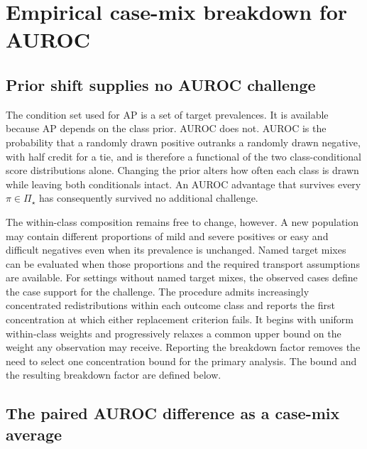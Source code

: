 \documentclass[11pt]{article}
\newcommand{\PSet}{\Pi_\star}
\theoremstyle{remark}
\begin{document}
\section{Empirical case-mix breakdown for AUROC}
\label{app:auroc}

\subsection{Prior shift supplies no AUROC challenge}

The condition set used for AP is a set of target prevalences. It is available
because AP depends on the class prior. AUROC does not. AUROC is the probability
that a randomly drawn positive outranks a randomly drawn negative, with half
credit for a tie, and is therefore a functional of the two class-conditional
score distributions alone. Changing the prior alters how often each class is
drawn while leaving both conditionals intact. An AUROC advantage that survives
every $\pi\in\PSet$ has consequently survived no additional challenge.

The within-class composition remains free to change, however. A new population
may contain different proportions of mild and severe positives or easy and
difficult negatives even when its prevalence is unchanged. Named target mixes
can be evaluated when those proportions and the required transport assumptions
are available. For settings without named target mixes, the observed cases
define the case support for the challenge. The procedure admits increasingly
concentrated redistributions within each outcome class and reports the first
concentration at which either replacement criterion fails. It begins with
uniform within-class weights and progressively relaxes a common upper bound on
the weight any observation may receive. Reporting the breakdown factor removes
the need to select one concentration bound for the primary analysis. The bound
and the resulting breakdown factor are defined below.

\subsection{The paired AUROC difference as a case-mix average}
\end{document}
